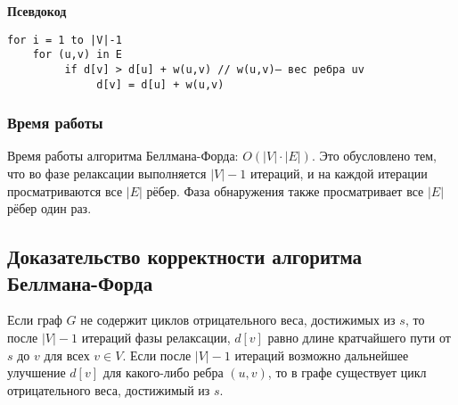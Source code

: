 \textbf{Псевдокод}
\begin{verbatim}
for i = 1 to |V|-1
    for (u,v) in E
         if d[v] > d[u] + w(u,v) // w(u,v)— вес ребра uv
              d[v] = d[u] + w(u,v)
\end{verbatim}

\subsubsection{Время работы}
Время работы алгоритма Беллмана-Форда: $O(|V| \cdot |E|)$.
Это обусловлено тем, что во фазе релаксации выполняется $|V|-1$ итераций, и на каждой итерации просматриваются все $|E|$ рёбер. Фаза обнаружения также просматривает все $|E|$ рёбер один раз.

\subsection{Доказательство корректности алгоритма Беллмана-Форда}

\begin{theorem}
	Если граф $G$ не содержит циклов отрицательного веса, достижимых из $s$, то после $|V|-1$ итераций фазы релаксации, $d[v]$ равно длине кратчайшего пути от $s$ до $v$ для всех $v \in V$.
	Если после $|V|-1$ итераций возможно дальнейшее улучшение $d[v]$ для какого-либо ребра $(u,v)$, то в графе существует цикл отрицательного веса, достижимый из $s$.
\end{theorem}

